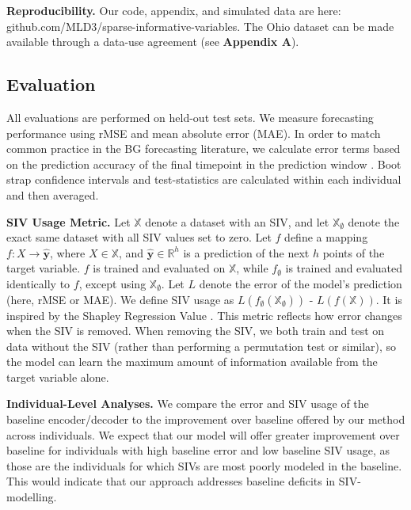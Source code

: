\documentclass[letterpaper]{article}
\begin{document}
\textbf{Reproducibility.} Our code, appendix, and simulated data are here: github.com/MLD3/sparse-informative-variables. The Ohio dataset can be made available through a data-use agreement (see \textbf{Appendix A}).


\subsection{Evaluation}

All evaluations are performed on held-out test sets. We measure forecasting performance using rMSE and mean absolute error (MAE). In order to match common practice in the BG forecasting literature, we calculate error terms based on the prediction accuracy of the final timepoint in the prediction window \cite{kn:oc}. Boot strap confidence intervals and test-statistics are calculated within each individual and then averaged.

\textbf{SIV Usage Metric.} Let $\mathbb{X}$ denote a dataset with an SIV, and let $\mathbb{X_\emptyset}$ denote the exact same dataset with all SIV values set to zero. Let $f$ define a mapping $f:X\rightarrow \mathbf{\hat{y}}$, where $X \in \mathbb{X}$, and $\mathbf{\hat{y}} \in \mathbb{R}^h$ is a prediction of the next $h$ points of the target variable. $f$ is trained and evaluated on $\mathbb{X}$, while $f_\emptyset$ is trained and evaluated identically to $f$, except using $\mathbb{X_\emptyset}$. Let $L$ denote the error of the model's prediction (here, rMSE or MAE). We define SIV usage as $L(f_\emptyset(\mathbb{X_\emptyset}))$ - $L(f(\mathbb{X}))$. It is inspired by the Shapley Regression Value \cite{shap}. This metric reflects how error changes when the SIV is removed. When removing the SIV, we both train and test on data without the SIV (rather than performing a permutation test or similar), so the model can learn the maximum amount of information available from the target variable alone.







\textbf{Individual-Level Analyses.} We compare the error and SIV usage of the baseline encoder/decoder to the improvement over baseline offered by our method across individuals.  We expect that our model will offer greater improvement over baseline for individuals with high baseline error and low baseline SIV usage, as those are the individuals for which SIVs are most poorly modeled in the baseline. This would indicate that our approach addresses baseline deficits in SIV-modelling.
\end{document}
